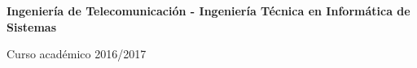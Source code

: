 \thispagestyle{empty}

\vspace{2cm}

\begin{figure}[htb]
\centerline{}
\end{figure}

\begin{center}
{\large{\facname}}

\vspace{10mm}

{\Large {\bf Ingeniería de Telecomunicación - Ingeniería Técnica en Informática de Sistemas}}
\vspace{5mm}

\vspace{1.0cm}

{\large {\bf \degreename}} 

\vspace{3cm}

{\Huge \ttitle}

\end{center}

\vspace{7cm}

\vspace{5mm}
\begin{center}
{\normalsize Curso académico 2016/2017}
\end{center}